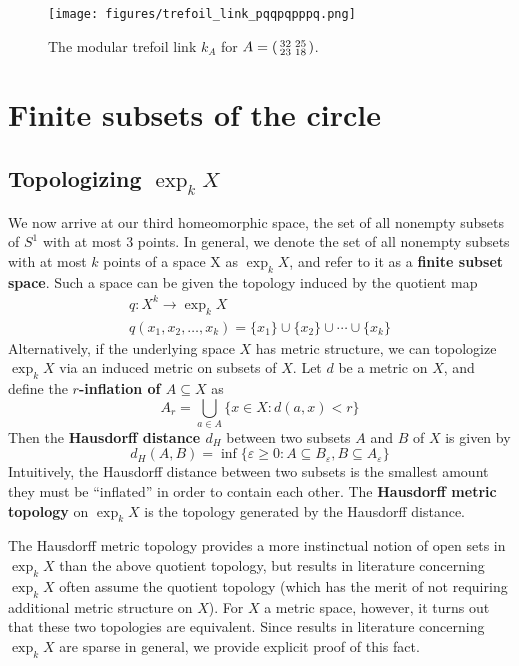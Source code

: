 \documentclass[12pt,twoside]{reedthesis}
\theoremstyle{definition}
\newcommand{\defnphrase}[1]{\textbf{#1}}
\begin{document}
\begin{figure}[h]
  \centering
  \texttt{[image: figures/trefoil\_link\_pqqpqpppq.png]}
  \caption{The modular trefoil link $k_A$ for $A = \protect\begin{psmallmatrix}32 & 25 \\ 23 & 18\protect\end{psmallmatrix}$.}
  \label{fig:trefoil_link_pqqpqpppq}
\end{figure}

\chapter{Finite subsets of the circle}\label{chap:finite_subsets}

\section{Topologizing $\exp_k X$}

We now arrive at our third homeomorphic space, the set of all nonempty subsets of $S^1$ with at most 3 points.
In general, we denote the set of all nonempty subsets with at most $k$ points of a space X as $\exp_k X$, and refer to it as a \defnphrase{finite subset space}.
Such a space can be given the topology induced by the quotient map
\begin{gather*}
  q : X^k \to \exp_k X \\
  q(x_1, x_2, \ldots, x_k) = \{x_1\} \cup \{x_2\} \cup \cdots \cup \{x_k\}
\end{gather*}
Alternatively, if the underlying space $X$ has metric structure, we can topologize $\exp_k X$ via an induced metric on subsets of $X$.
Let $d$ be a metric on $X$, and define the \defnphrase{$r$-inflation of $A \subseteq X$} as
\begin{equation*}
  A_r = \bigcup_{a \in A} \{ x \in X : d(a, x) < r \}
\end{equation*}
Then the \defnphrase{Hausdorff distance $d_H$} between two subsets $A$ and $B$ of $X$ is given by
\begin{equation*}
  d_H(A, B) = \inf \{ \varepsilon \geq 0 : A \subseteq B_\varepsilon, B \subseteq A_\varepsilon \}
\end{equation*}
Intuitively, the Hausdorff distance between two subsets is the smallest amount they must be ``inflated'' in order to contain each other.
The \defnphrase{Hausdorff metric topology} on $\exp_k X$ is the topology generated by the Hausdorff distance.

The Hausdorff metric topology provides a more instinctual notion of open sets in $\exp_k X$ than the above quotient topology, but results in literature concerning $\exp_k X$ often assume the quotient topology (which has the merit of not requiring additional metric structure on $X$).
For $X$ a metric space, however, it turns out that these two topologies are equivalent.
Since results in literature concerning $\exp_k X$ are sparse in general, we provide explicit proof of this fact.
\end{document}
